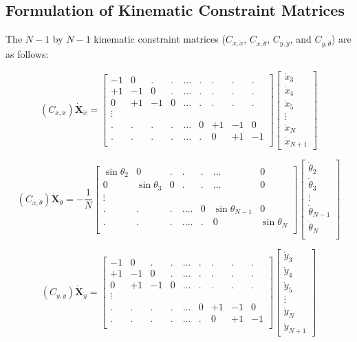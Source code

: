 \documentclass[12pt,letterpaper,titlepage]{article}
\begin{document}
\subsection{Formulation of Kinematic Constraint Matrices}
The $N - 1$ by $N - 1$ kinematic constraint matrices ($C_{x,\dot{x}}$, $C_{x,\dot{\theta}}$, $C_{y,\dot{y}}$, and $C_{y,\dot{\theta}}$) are as follows:

\[
(C_{x,\dot{x}}) \mathbf{\dot{X}}_{\dot{x}} = \begin{bmatrix}
-1&0&.&.&\hdots&.&.&.&.\\
+1&-1&0&.&\hdots&.&.&.&.\\
0&+1&-1&0&\hdots&.&.&.&.\\
\vdots \\
.&.&.&.&\hdots&0&+1&-1&0\\
.&.&.&.&\hdots&.&0&+1&-1\\
\end{bmatrix}
\begin{bmatrix}
\dot{x}_3\\
\dot{x}_4\\
\dot{x}_5\\
\vdots\\
\dot{x}_N\\
\dot{x}_{N+1}
\end{bmatrix}
\]

\[
(C_{x,\dot{\theta}}) \mathbf{\dot{X}}_{\dot{\theta}} = - \frac{1}{N} \begin{bmatrix}
\sin\theta_2&0&.&.&.& \hdots &0\\
0&\sin\theta_3&0&.&.& \hdots &0\\
\vdots \\
.&.&.&.\hdots &0&\sin\theta_{N-1}&0\\
.&.&.&.\hdots &.&0&\sin\theta_N\\
\end{bmatrix}
\begin{bmatrix}
\dot{\theta}_2\\
\dot{\theta}_3\\
\vdots\\
\dot{\theta}_{N-1}\\
\dot{\theta}_N\\
\end{bmatrix}
\]

\[
(C_{y,\dot{y}}) \mathbf{\dot{X}}_{\dot{y}} = \begin{bmatrix}
-1&0&.&.&\hdots&.&.&.&.\\
+1&-1&0&.&\hdots&.&.&.&.\\
0&+1&-1&0&\hdots&.&.&.&.\\
\vdots \\
.&.&.&.&\hdots&0&+1&-1&0\\
.&.&.&.&\hdots&.&0&+1&-1\\
\end{bmatrix}
\begin{bmatrix}
\dot{y}_3\\
\dot{y}_4\\
\dot{y}_5\\
\vdots\\
\dot{y}_N\\
\dot{y}_{N+1}
\end{bmatrix}
\]
\end{document}

